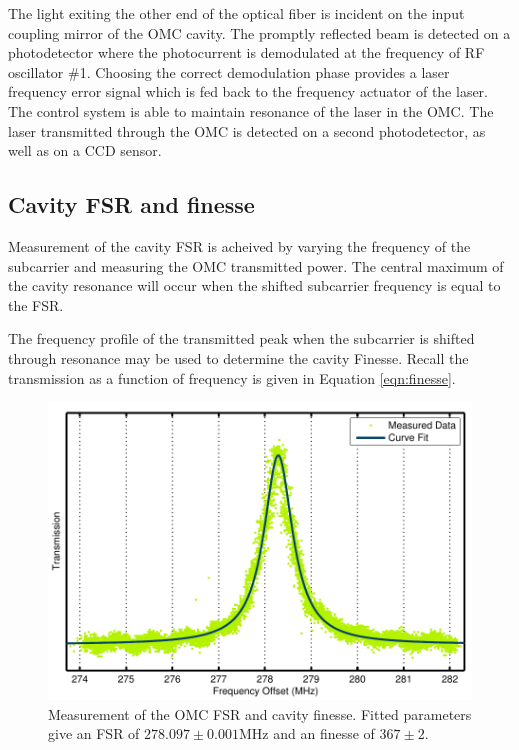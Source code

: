 The light exiting the other end of the optical fiber is incident on the input coupling mirror of the OMC cavity. %
The promptly reflected beam is detected on a photodetector where the photocurrent is demodulated at the frequency of RF oscillator \#1. %
Choosing the correct demodulation phase provides a laser frequency error signal which is fed back to the frequency actuator of the laser. %
The control system is able to maintain resonance of the laser in the OMC. %
The laser transmitted through the OMC is detected on a second photodetector, as well as on a CCD sensor.

\subsection{Cavity FSR and finesse}
Measurement of the cavity FSR is acheived by varying the frequency of the subcarrier and measuring the OMC transmitted power. %
The central maximum of the cavity resonance will occur when the shifted subcarrier frequency is equal to the FSR.

The frequency profile of the transmitted peak when the subcarrier is shifted through resonance may be used to determine the cavity Finesse. %
Recall the transmission as a function of frequency is given in Equation \ref{eqn:finesse}.
\begin{figure}
  \begin{center}
  \leavevmode
  \includegraphics{figs-omc/FSRfit.pdf}
  \end{center}
  \caption{Measurement of the OMC FSR and cavity finesse. Fitted parameters give an FSR of $278.097 \pm 0.001$MHz and an finesse of $367\pm2$.}
  \label{fig:FSRfit}
\end{figure}

